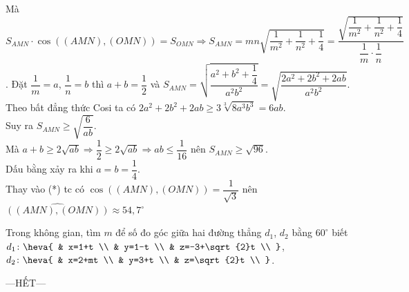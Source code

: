 \begin{ex}
{		Mà ${S_{AMN}}\cdot \cos\left( \left( AMN \right),\left( OMN \right) \right)={S_{OMN}}\Rightarrow {S_{AMN}}=mn\sqrt{\dfrac{1}{m^2}+\dfrac{1}{n^2}+\dfrac{1}{4}}=\dfrac{\sqrt{\dfrac{1}{m^2}+\dfrac{1}{n^2}+\dfrac{1}{4}}}{\dfrac{1}{m}\cdot\dfrac{1}{n}}$.
		Đặt $\dfrac{1}{m}=a$, $\dfrac{1}{n}=b$ thì $a+b=\dfrac{1}{2}$ và ${S_{AMN}}=\sqrt{\dfrac{a^2+b^2+\dfrac{1}{4}}{a^2b^2}}=\sqrt{\dfrac{2a^2+2b^2+2ab}{a^2{b^2}}}$.\\
		Theo bất đẳng thức Cosi ta có $2a^2+2b^2+2ab\ge 3\sqrt[3]{8a^3{b^3}}=6ab$.\\
		Suy ra ${S_{AMN}}\ge \sqrt{\dfrac{6}{ab}}$.\\ Mà $a+b\ge 2\sqrt{ab}\Rightarrow \dfrac{1}{2}\ge 2\sqrt{ab}\Rightarrow ab\le \dfrac{1}{16}$ nên ${S_{AMN}}\ge \sqrt{96}$.\\
		Dấu bằng xảy ra khi $a=b=\dfrac{1}{4}$.\\ Thay vào (*) tc có $\cos\left( \left( AMN \right),\left( OMN \right) \right)=\dfrac{1}{\sqrt{3}}$ nên $\widehat{\left( \left( AMN \right),\left( OMN \right) \right)}\approx 54,7^\circ$\\
	}
\end{ex}

\begin{ex}%
	Trong không gian, tìm $m$ để số đo góc giữa hai đường thẳng $d_1$, $d_2$ bằng $60^\circ$ biết $d_1\colon\heva{
		& x=1+t \\
		& y=1-t \\
		& z=-3+\sqrt{2}t \\
	}$, $d_2 \colon\heva{
		& x=2+mt \\
		& y=3+t \\
		& z=\sqrt{2}t \\
	}$.\\
\end{ex}

\centerline{---HẾT---}
	
	




